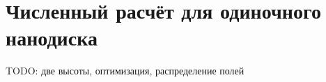 \section{Численный расчёт для одиночного нанодиска}

TODO: две высоты, оптимизация, распределение полей
